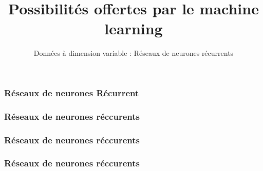\documentclass{formation}
\title{Possibilités offertes par le machine learning}
\subtitle{Données à dimension variable : Réseaux de neurones récurrents}
\begin{document}
\maketitle

\begin{frame}
  \frametitle{Réseaux de neurones Récurrent}
\end{frame}

\begin{frame}
  \frametitle{Réseaux de neurones réccurents}
\end{frame}

\begin{frame}
  \frametitle{Réseaux de neurones réccurents}
\end{frame}

\begin{frame}
  \frametitle{Réseaux de neurones réccurents}
\end{frame}
\end{document}
